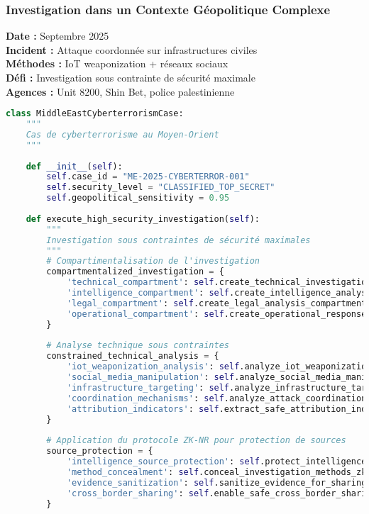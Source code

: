 \subsubsection{Investigation dans un Contexte Géopolitique Complexe}

\textbf{Date :} Septembre 2025 \\
\textbf{Incident :} Attaque coordonnée sur infrastructures civiles \\
\textbf{Méthodes :} IoT weaponization + réseaux sociaux \\
\textbf{Défi :} Investigation sous contrainte de sécurité maximale \\
\textbf{Agences :} Unit 8200, Shin Bet, police palestinienne

\begin{lstlisting}[language=Python, caption=Investigation cyberterrorisme avec contraintes géopolitiques]
class MiddleEastCyberterrorismCase:
    """
    Cas de cyberterrorisme au Moyen-Orient
    """
    
    def __init__(self):
        self.case_id = "ME-2025-CYBERTERROR-001"
        self.security_level = "CLASSIFIED_TOP_SECRET"
        self.geopolitical_sensitivity = 0.95
        
    def execute_high_security_investigation(self):
        """
        Investigation sous contraintes de sécurité maximales
        """
        # Compartimentalisation de l'investigation
        compartmentalized_investigation = {
            'technical_compartment': self.create_technical_investigation_compartment(),
            'intelligence_compartment': self.create_intelligence_analysis_compartment(),
            'legal_compartment': self.create_legal_analysis_compartment(),
            'operational_compartment': self.create_operational_response_compartment()
        }
        
        # Analyse technique sous contraintes
        constrained_technical_analysis = {
            'iot_weaponization_analysis': self.analyze_iot_weaponization_techniques(),
            'social_media_manipulation': self.analyze_social_media_manipulation(),
            'infrastructure_targeting': self.analyze_infrastructure_targeting_methods(),
            'coordination_mechanisms': self.analyze_attack_coordination_mechanisms(),
            'attribution_indicators': self.extract_safe_attribution_indicators()
        }
        
        # Application du protocole ZK-NR pour protection de sources
        source_protection = {
            'intelligence_source_protection': self.protect_intelligence_sources_zknr(),
            'method_concealment': self.conceal_investigation_methods_zknr(),
            'evidence_sanitization': self.sanitize_evidence_for_sharing_zknr(),
            'cross_border_sharing': self.enable_safe_cross_border_sharing_zknr()
        }
        

\end{lstlisting}
